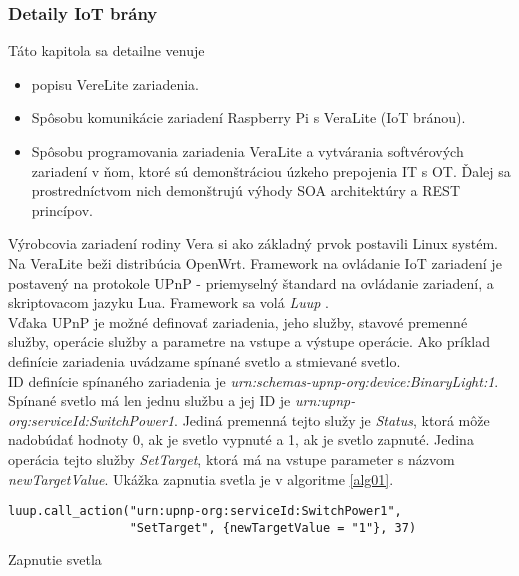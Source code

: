 \subsubsection{Detaily IoT brány}
Táto kapitola sa detailne venuje
\begin{itemize}
  \item popisu VereLite zariadenia.
  \item Spôsobu komunikácie zariadení Raspberry Pi s VeraLite (IoT bránou).
  \item Spôsobu programovania zariadenia VeraLite a vytvárania softvérových zariadení v ňom, ktoré sú demonštráciou úzkeho prepojenia IT s OT. Ďalej sa prostredníctvom nich demonštrujú výhody SOA architektúry a REST princípov.   
\end{itemize} 
Výrobcovia zariadení rodiny Vera si ako základný prvok postavili Linux systém. Na VeraLite beži distribúcia OpenWrt. Framework na ovládanie IoT zariadení je postavený na protokole UPnP - priemyselný štandard na ovládanie zariadení, a skriptovacom jazyku Lua. Framework sa volá \textit{Luup} \cite{IOT28}.\\ 
\indent Vďaka UPnP je možné definovať zariadenia, jeho služby, stavové premenné služby, operácie služby a parametre na vstupe a výstupe operácie. Ako príklad definície zariadenia uvádzame spínané svetlo a stmievané svetlo.\\
\indent ID definície spínaného zariadenia je \textit{urn:schemas-upnp-org:device:BinaryLight:1}. Spínané svetlo má len jednu službu a jej ID je \textit{urn:upnp-org:serviceId:SwitchPower1}. Jediná premenná tejto služy je \textit{Status}, ktorá môže nadobúdať hodnoty 0, ak je svetlo vypnuté a 1, ak je svetlo zapnuté. Jedina operácia tejto služby \textit{SetTarget}, ktorá má na vstupe parameter s názvom \textit{newTargetValue}. Ukážka zapnutia svetla je v algoritme \ref{alg01}. 
\begin{algorithm}
%
\begin{lstlisting}
luup.call_action("urn:upnp-org:serviceId:SwitchPower1",
                 "SetTarget", {newTargetValue = "1"}, 37)
\end{lstlisting}
 \caption{Zapnutie svetla}
 \label{alg01}
\end{algorithm}

